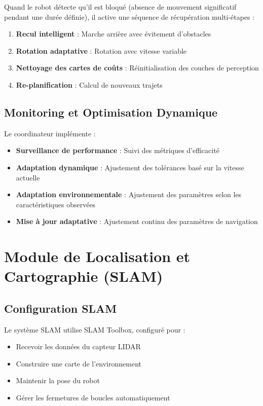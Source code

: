 \documentclass[12pt,a4paper,oneside]{report}
\begin{document}
Quand le robot détecte qu'il est bloqué (absence de mouvement significatif pendant une durée définie), il active une séquence de récupération multi-étapes :

\begin{enumerate}
  \item \textbf{Recul intelligent} : Marche arrière avec évitement d'obstacles
  \item \textbf{Rotation adaptative} : Rotation avec vitesse variable
  \item \textbf{Nettoyage des cartes de coûts} : Réinitialisation des couches de perception
  \item \textbf{Re-planification} : Calcul de nouveaux trajets
\end{enumerate}

\subsection{Monitoring et Optimisation Dynamique}

Le coordinateur implémente :

\begin{itemize}
  \item \textbf{Surveillance de performance} : Suivi des métriques d'efficacité
  \item \textbf{Adaptation dynamique} : Ajustement des tolérances basé sur la vitesse actuelle
  \item \textbf{Adaptation environnementale} : Ajustement des paramètres selon les caractéristiques observées
  \item \textbf{Mise à jour adaptative} : Ajustement continu des paramètres de navigation
\end{itemize}

\section{Module de Localisation et Cartographie (SLAM)}

\subsection{Configuration SLAM}

Le système SLAM utilise SLAM Toolbox, configuré pour :

\begin{itemize}
  \item Recevoir les données du capteur LIDAR
  \item Construire une carte de l'environnement
  \item Maintenir la pose du robot
  \item Gérer les fermetures de boucles automatiquement
\end{itemize}
\end{document}
